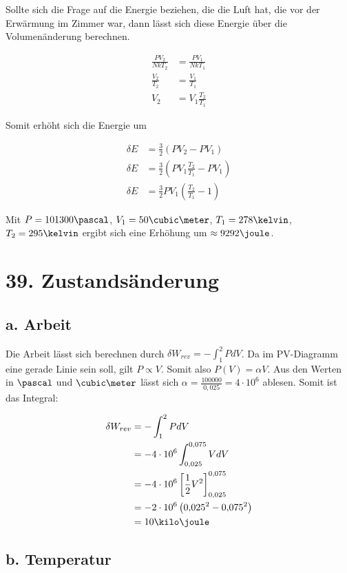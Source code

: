 \documentclass[a4paper,german,12pt,smallheadings]{scrartcl}
\begin{document}
Sollte sich die Frage auf die Energie beziehen, die die Luft hat, die vor der
Erwärmung im Zimmer war, dann lässt sich diese Energie über die Volumenänderung
berechnen.

\begin{align*}
  \frac{PV_2}{NkT_2} &= \frac{PV_1}{NkT_1} \\
  \frac{V_2}{T_2} &= \frac{V_1}{T_1} \\
  V_2 &= V_1 \frac{T_2}{T_1}
\end{align*}

Somit erhöht sich die Energie um

\begin{align*}
  \delta E &= \frac{3}{2} (PV_2 - PV_1) \\
  \delta E &= \frac{3}{2} \left(PV_1 \frac{T_2}{T_1} - PV_1\right) \\
  \delta E &= \frac{3}{2} PV_1 \left(\frac{T_2}{T_1} - 1\right)
\end{align*}

Mit $P = 101300 \pascal$, $V_1 = 50 \cubic\meter$, $T_1 = 278 \kelvin$, $T_2 =
295 \kelvin$ ergibt sich eine Erhöhung um $\approx 9292 \joule$.

\section*{39. Zustandsänderung}
\subsection*{a. Arbeit}

Die Arbeit lässt sich berechnen durch $\delta W_{rev} = -\int_1^2 PdV$. Da im
PV-Diagramm eine gerade Linie sein soll, gilt $P \propto V$. Somit also $P(V) =
\alpha V$. Aus den Werten in $\pascal$ und $\cubic\meter$ lässt sich $\alpha = \frac{100000}{0{,}025} = 4\cdot 10^6$ ablesen. Somit ist
das Integral:

\begin{align*}
  \delta W_{rev} &= -\int_1^2 PdV \\
                 &= -4 \cdot 10^6 \int_{0{,}025}^{0{,}075} V dV \\
                 &= -4 \cdot 10^6 \left[\frac{1}{2}V^2\right]_{0{,}025}^{0{,}075} \\
                 &= -2 \cdot 10^6 \left(0{,}025^2-0{,}075^2\right) \\
                 &= 10 \kilo\joule
\end{align*}

\subsection*{b. Temperatur}
\end{document}

